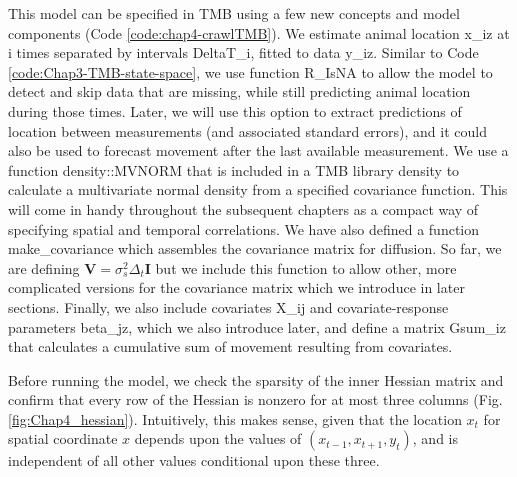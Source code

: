 This model can be specified in TMB using a few new concepts and model components (Code \ref{code:chap4-crawlTMB}).  We estimate animal location \colorbox{backblue}{x\_iz} at \colorbox{backblue}{i} times separated by intervals \colorbox{backblue}{DeltaT\_i}, fitted to data \colorbox{backblue}{y\_iz}.  Similar to Code \ref{code:Chap3-TMB-state-space}, we use function \colorbox{backblue}{R\_IsNA} to allow the model to detect and skip data that are missing, while still predicting animal location during those times.  Later, we will use this option to extract predictions of location between measurements (and associated standard errors), and it could also be used to forecast movement after the last available measurement. We use a function \colorbox{backblue}{density::MVNORM} that is included in a TMB library \colorbox{backblue}{density} to calculate a multivariate normal density from a specified covariance function. This  will come in handy throughout the subsequent chapters as a compact way of specifying spatial and temporal correlations. We have also defined a function \colorbox{backblue}{make\_covariance} which assembles the covariance matrix for diffusion.  So far, we are defining \( \mathbf{V}=\sigma_s^2 \Delta_t \mathbf{I} \) but we include this function to allow other, more complicated versions for the covariance matrix which we introduce in later sections. Finally, we also include covariates \colorbox{backblue}{X\_ij} and covariate-response parameters \colorbox{backblue}{beta\_jz}, which we also introduce later, and define a matrix \colorbox{backblue}{Gsum\_iz} that calculates a cumulative sum of movement resulting from covariates.     

\lstset{style=TMBcode}


Before running the model, we check the sparsity of the inner Hessian matrix and confirm that every row of the Hessian is nonzero for at most three columns (Fig. \ref{fig:Chap4_hessian}).  Intuitively, this makes sense, given that the location \( x_{t} \) for spatial coordinate \(x\) depends upon the values of \( ( x_{t-1}, x_{t+1}, y_{t} ) \), and is independent of all other values conditional upon these three. 

